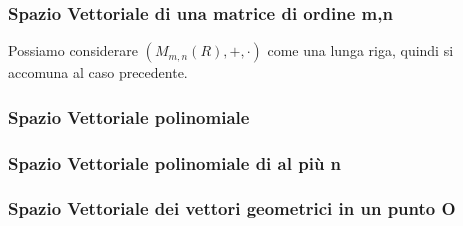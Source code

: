 \subsubsection{Spazio Vettoriale di una matrice di ordine m,n}
Possiamo considerare $(M_{m,n}(R), +, \cdot)$ come una lunga riga, quindi si accomuna al caso precedente.
\subsubsection{Spazio Vettoriale polinomiale}

\subsubsection{Spazio Vettoriale polinomiale di al più n}

\subsubsection{Spazio Vettoriale dei vettori geometrici in un punto O}



 



